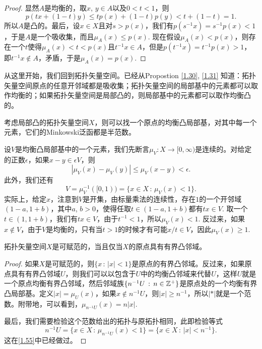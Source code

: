 \begin{proof}
显然$A$是均衡的，取$x$, $y\in A$以及$0<t<1$，则
\[
	p(tx+(1-t)y)\leq tp(x)+(1-t)p(y)< t+(1-t)=1.
\]
所以$A$是凸的。最后，设$x\in X$且对$s>p(x)$，我们有$p(s^{-1}x)=s^{-1}p(x)<1$，于是$A$是一个吸收集，而且$\mu_A(x)\leq p(x)$. 现在假设$\mu_A(x)<p(x)$，则存在一个$t$使得$\mu_A(x)<t<p(x)$且$t^{-1}x\in A$，但是$p(t^{-1}x)=t^{-1}p(x)>1$，即$t^{-1}x\not\in A$，矛盾，于是$\mu_A(x)=p(x)$.
\end{proof}

\begin{para}\label{1.55}
从这里开始，我们回到拓扑矢量空间。已经从Propostion \ref{1.30}, \ref{1.31} 知道：拓扑矢量空间原点的任意开邻域都是吸收集；拓扑矢量空间的局部基中的元素都可以取作均衡的；如果拓扑矢量空间是局部凸的，则局部基中的元素都可以取作均衡凸的。

考虑局部凸的拓扑矢量空间$X$，则可以找一个原点的均衡凸局部基，对其中每一个元素，它们的Minkowski泛函都是半范数。

设$V$是均衡凸局部基中的一个元素，我们先断言$\mu_V:X\to [0,\infty)$是连续的。对给定的正数$\epsilon$，如果$x-y\in \epsilon V$，则
\[
	|\mu_V(x)-\mu_V(y)|\leq \mu_V(x-y)<\epsilon.
\]
此外，我们还有
\[
	V=\mu_V^{-1}([0,1))=\{x\in X\,:\, \mu_V(x)<1\}.
\]
实际上，给定$x$，注意到$V$是开集，由标量乘法的连续性，存在$1$的一个开邻域$(1-a,1+b)$，其中$a$, $b>0$，使得任取$t\in (1-a,1+b)$都有$tx\in V$. 取一个$t\in (1,1+b)$，我们有$tx\in V$，由于$t^{-1}<1$，所以$\mu_V(x)<1$. 反过来，如果$x\not\in V$，由于$V$是均衡的，只有当$t>1$的时候才有可能$x/t \in V$，因此$\mu_V(x)\geq 1$.
\end{para}

\begin{thm}\label{1.56}
拓扑矢量空间$X$是可赋范的，当且仅当$X$的原点具有有界凸邻域。
\end{thm}

\begin{proof}
如果$X$是可赋范的，则$\{x\,:\, |x|<1\}$是原点的有界凸邻域。反过来，如果原点具有有界凸邻域$U$，则我们可以以包含于$U$中的均衡凸邻域来代替$U$，这样$U$就是一个原点均衡有界凸邻域，然后邻域族$\{n^{-1}U\,:\, n\in \mathbb{Z}^+\}$是原点处的一个均衡有界凸局部基。定义$|x|=\mu_U(x)$，如果$x\not\in n^{-1}U$，则$|x|\geq n^{-1}$，所以$|*|$就是一个范数。附带地，可以看到，$\mu_{n^{-1}U}(x)=n|x|$.

最后，我们需要检验这个范数给出的拓扑与原拓扑相同，此即检验等式
\[
	n^{-1}U=\{x\in X\,:\, \mu_{n^{-1}U}(x)<1\}=\{x\in X\,:\,|x|<n^{-1}\}.
\]
这在\ref{1.55}中已经做过。
\end{proof}

